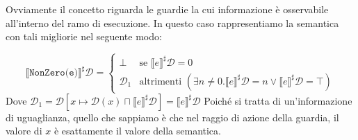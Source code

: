 Ovviamente il concetto riguarda le guardie la cui informazione è osservabile 
all'interno del ramo di esecuzione.
In questo caso rappresentiamo la semantica con tali migliorie nel seguente modo:

 \[
        \llbracket \texttt{NonZero(e)} \rrbracket^\sharp \mathcal{D} = 
        \begin{cases}
            \bot & \text{se } \llbracket e \rrbracket^\sharp \mathcal{D} = 0 \\
            \mathcal{D}_1 & \text{altrimenti } (\exists n \not = 0 . 
            \llbracket e \rrbracket^\sharp \mathcal{D} = n \lor
            \llbracket e \rrbracket^\sharp \mathcal{D} = \top)
        \end{cases}  
\]
Dove $\mathcal{D}_1 = \mathcal{D}[x \mapsto \mathcal{D}(x)
\sqcap \llbracket e \rrbracket^\sharp \mathcal{D}] = \llbracket e \rrbracket^\sharp \mathcal{D}$
Poiché si tratta di un'informazione di uguaglianza, quello che sappiamo è che nel raggio di 
azione della guardia, il valore di $x$ è esattamente il valore della semantica.
